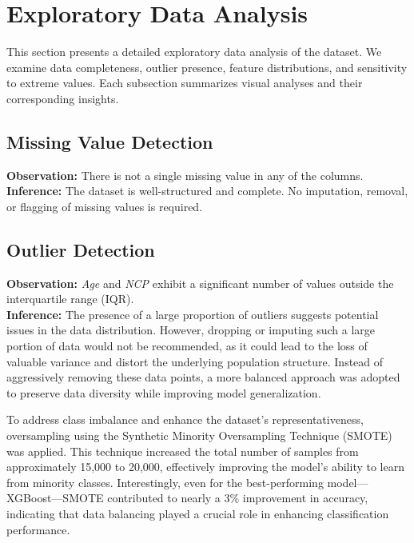 \chapter{Exploratory Data Analysis}\label{ch:exploratory-data-analysis}

This section presents a detailed exploratory data analysis of the dataset.
We examine data completeness, outlier presence, feature distributions, and sensitivity to extreme values.
Each subsection summarizes visual analyses and their corresponding insights.



\section{Missing Value Detection}\label{sec:missing-value-detection}
\textbf{Observation:} There is not a single missing value in any of the columns.\\
\textbf{Inference:} The dataset is well-structured and complete.
No imputation, removal, or flagging of missing values is required.



\section{Outlier Detection}\label{sec:outlier-detection}
\textbf{Observation:} \textit{Age} and \textit{NCP} exhibit a significant number of values outside the interquartile range (IQR).\\
\textbf{Inference:}
The presence of a large proportion of outliers suggests potential issues in the data distribution.
However, dropping or imputing such a large portion of data would not be recommended, as it could lead to the loss of valuable variance and distort the underlying population structure.
Instead of aggressively removing these data points, a more balanced approach was adopted to preserve data diversity while improving model generalization.

To address class imbalance and enhance the dataset’s representativeness, oversampling using the Synthetic Minority Oversampling Technique (SMOTE) was applied.
This technique increased the total number of samples from approximately 15,000 to 20,000, effectively improving the model’s ability to learn from minority classes.
Interestingly, even for the best-performing model— XGBoost—SMOTE contributed to nearly a 3\% improvement in accuracy, indicating that data balancing played a crucial role in enhancing classification performance.

